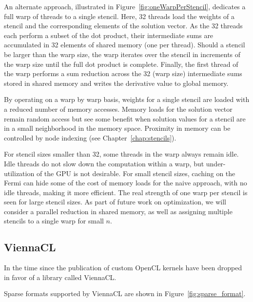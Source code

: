 \documentclass{report}
\begin{document}
An alternate approach, illustrated in Figure~\ref{fig:oneWarpPerStencil}, dedicates a full warp of threads to a single stencil. Here, 32 threads load the weights of a stencil and the corresponding elements of the solution vector. As the 32 threads each perform a subset of the dot product, their intermediate sums are accumulated in 32 elements of shared memory (one per thread).
Should  a stencil be larger than the warp size, the warp iterates over the stencil in increments of the warp size until the full dot product is complete. Finally, the first thread of the warp performs a sum reduction across the 32 (warp size)  intermediate sums stored in shared memory and writes the derivative value to global memory. 

By operating on a warp by warp basis, weights for a single stencil are loaded with a reduced number of memory accesses. Memory loads for the solution vector remain random access but see some benefit when solution values for a stencil are in a small neighborhood in the memory space. Proximity in memory can be controlled by node indexing (see Chapter~\ref{chap:stencils}). 

For stencil sizes smaller than 32, some threads in the warp always remain idle. Idle threads do not slow down the computation within a warp, but under-utilization of the GPU is not desirable. For small stencil sizes, caching on the Fermi can hide some of the cost of memory loads for the naive approach, with no idle threads, making it more efficient. The real strength of one warp per stencil is seen for large stencil sizes. 
As part of future work on optimization, we will consider a parallel reduction in shared memory, as well as assigning multiple stencils to a single warp for small  $n$. 





\subsection{ViennaCL} 

In the time since the publication of \cite{BolligFlyerErlebacher2012} custom OpenCL kernels have been dropped in favor of a library called ViennaCL. 

Sparse formats supported by ViennaCL are shown in Figure~\ref{fig:sparse_format}.
\end{document}

